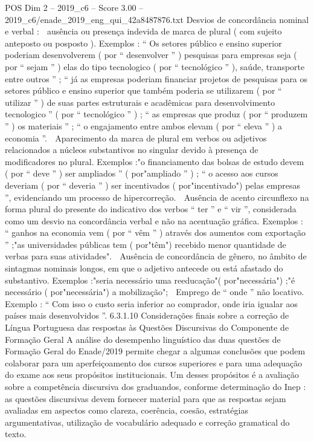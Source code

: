 \begin{textsample}{POS Dim 2 – 2019\_c6 – Score 3.00 – 2019\_c6/enade\_2019\_eng\_qui\_42a8487876.txt}
Desvios de concordância nominal e verbal :  ausência ou presença indevida de marca de plural ( com sujeito anteposto ou posposto ).
Exemplos : “ Os setores público e ensino superior poderiam desenvolverem ( por “ desenvolver ” ) pesquisas para empresas seja ( por “ sejam ” ) elas do tipo tecnologico ( por “ tecnológico ” ), saúde, transporte entre outros ” ; “ já as empresas poderiam financiar projetos de pesquisas para os setores público e ensino superior que também poderia se utilizarem ( por “ utilizar ” ) de suas partes estruturais e acadêmicas para desenvolvimento tecnologico ” ( por “ tecnológico ” ) ; “ as empresas que produz ( por “ produzem ” ) os materiais ” ; “ o engajamento entre ambos elevam ( por “ eleva ” ) a economia ”.  Aparecimento da marca de plural em verbos ou adjetivos relacionados a núcleos substantivos no singular devido à presença de modificadores no plural.
Exemplos :"o financiamento das bolsas de estudo devem ( por “ deve ” ) ser ampliados ” ( por"ampliado ” ) ; “ o acesso aos cursos deveriam ( por “ deveria ” ) ser incentivados ( por"incentivado") pelas empresas ”, evidenciando um processo de hipercorreção.  Ausência de acento circunflexo na forma plural do presente do indicativo dos verbos “ ter ” e “ vir ”, considerada como um desvio na concordância verbal e não na acentuação gráfica.
Exemplos : “ ganhos na economia vem ( por “ vêm ” ) através dos aumentos com exportação ” ;"as universidades públicas tem ( por"têm") recebido menor quantidade de verbas para suas atividades".  Ausência de concordância de gênero, no âmbito de sintagmas nominais longos, em que o adjetivo antecede ou está afastado do substantivo.
Exemplos :"seria necessário uma reeducação"( por"necessária") ;"é necessário ( por"necessária") a mobilização";  Emprego de “ onde ” não locativo.
Exemplo : “ Com isso o custo seria inferior ao comprador, onde iria igualar aos países mais desenvolvidos ”. 6.3.1.10 Considerações finais sobre a correção de Língua Portuguesa das respostas às Questões Discursivas do Componente de Formação Geral A análise do desempenho linguístico das duas questões de Formação Geral do Enade/2019 permite chegar a algumas conclusões que podem colaborar para um aperfeiçoamento dos cursos superiores e para uma adequação do exame aos seus propósitos institucionais.
Um desses propósitos é a avaliação sobre a competência discursiva dos graduandos, conforme determinação do Inep : as questões discursivas devem fornecer material para que as respostas sejam avaliadas em aspectos como clareza, coerência, coesão, estratégias argumentativas, utilização de vocabulário adequado e correção gramatical do texto.

\end{textsample}
